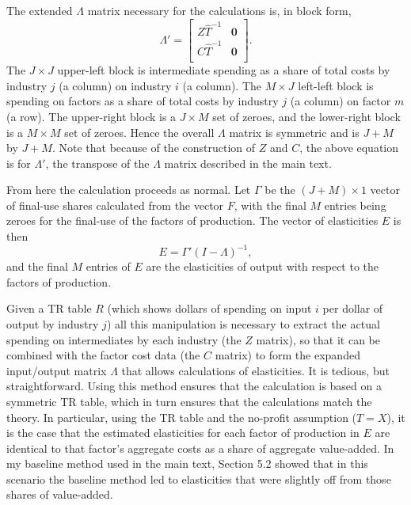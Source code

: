 The extended $\Lambda$ matrix necessary for the calculations is, in block form,
\begin{equation}
	\Lambda' = 	\begin{bmatrix}
		Z\hat{T}^{-1} & \mathbf{0}  \\
		C\hat{T}^{-1} &\mathbf{0}  \\
	\end{bmatrix}.
\end{equation}
The $J\times J$ upper-left block is intermediate spending as a share of total costs by industry $j$ (a column) on industry $i$ (a column). The $M\times J$ left-left block is spending on factors as a share of total costs by industry $j$ (a column) on factor $m$ (a row). The upper-right block is a $J\times M$ set of zeroes, and the lower-right block is a $M\times M$ set of zeroes. Hence the overall $\Lambda$ matrix is symmetric and is $J+M$ by $J+M$. Note that because of the construction of $Z$ and $C$, the above equation is for $\Lambda'$, the transpose of the $\Lambda$ matrix described in the main text.

From here the calculation proceeds as normal. Let $\Gamma$ be the $(J+M)\times 1$ vector of final-use shares calculated from the vector $F$, with the final $M$ entries being zeroes for the final-use of the factors of production. The vector of elasticities $E$ is then
\begin{equation}
	E = \Gamma' (I - \Lambda)^{-1},
\end{equation}
and the final $M$ entries of $E$ are the elasticities of output with respect to the factors of production. 

Given a TR table $R$ (which shows dollars of spending on input $i$ per dollar of output by industry $j$) all this manipulation is necessary to extract the actual spending on intermediates by each industry (the $Z$ matrix), so that it can be combined with the factor cost data (the $C$ matrix) to form the expanded input/output matrix $\Lambda$ that allows calculations of elasticities. It is tedious, but straightforward. Using this method ensures that the calculation is based on a symmetric TR table, which in turn ensures that the calculations match the theory. In particular, using the TR table and the no-profit assumption ($T=X$), it is the case that the estimated elasticities for each factor of production in $E$ are identical to that factor's aggregate costs as a share of aggregate value-added. In my baseline method used in the main text, Section 5.2 showed that in this scenario the baseline method led to elasticities that were slightly off from those shares of value-added. 







